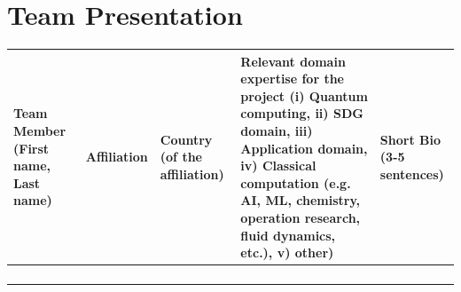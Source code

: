 \documentclass{oqireport}
\begin{document}


\newpage

\section*{Team Presentation}

\begin{center}
\begin{tabular}{ | m{5em} | m{4em}| m{5em} | m{15em} | m{8em} | } 
 \hline
 Team Member 
 (First name, Last name)
 & Affiliation & Country (of the affiliation) & Relevant domain expertise for the project 
(i) Quantum computing, 
ii) SDG domain, 
iii) Application domain, 
iv) Classical computation (e.g. AI, ML, chemistry, operation research, fluid dynamics, etc.), 
v) other)
& Short Bio (3-5 sentences) 
 \\ 
 \hline 
  &  &  &  & \\ 
 \hline
 &  &  &  & \\ 
 \hline
  &  &  &  & \\ 
 \hline
  &  &  &  & \\ 
 \hline
\end{tabular}
\end{center}



\end{document}
